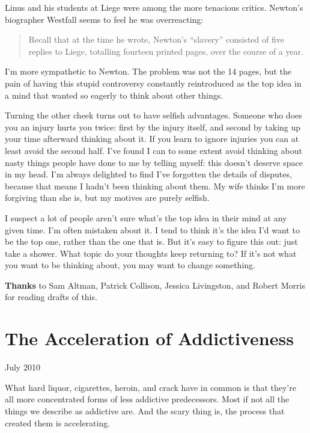 \documentclass[12pt]{book}
\begin{document}
Linus and his students at Liege were among the more tenacious critics.
Newton's biographer Westfall seems to feel he was overreacting:

\begin{quote}
Recall that at the time he wrote, Newton's ``slavery'' consisted of five
replies to Liege, totalling fourteen printed pages, over the course of a
year.
\end{quote}

I'm more sympathetic to Newton. The problem was not the 14 pages, but
the pain of having this stupid controversy constantly reintroduced as
the top idea in a mind that wanted so eagerly to think about other
things.

Turning the other cheek turns out to have selfish advantages. Someone
who does you an injury hurts you twice: first by the injury itself, and
second by taking up your time afterward thinking about it. If you learn
to ignore injuries you can at least avoid the second half. I've found I
can to some extent avoid thinking about nasty things people have done to
me by telling myself: this doesn't deserve space in my head. I'm always
delighted to find I've forgotten the details of disputes, because that
means I hadn't been thinking about them. My wife thinks I'm more
forgiving than she is, but my motives are purely selfish.

I suspect a lot of people aren't sure what's the top idea in their mind
at any given time. I'm often mistaken about it. I tend to think it's the
idea I'd want to be the top one, rather than the one that is. But it's
easy to figure this out: just take a shower. What topic do your thoughts
keep returning to? If it's not what you want to be thinking about, you
may want to change something.


\textbf{Thanks} to Sam Altman, Patrick Collison, Jessica Livingston, and
Robert Morris for reading drafts of this.
\chapter{The Acceleration of Addictiveness}

July 2010

What hard liquor, cigarettes, heroin, and crack have in common is that
they're all more concentrated forms of less addictive predecessors. Most
if not all the things we describe as addictive are. And the scary thing
is, the process that created them is accelerating.
\end{document}
